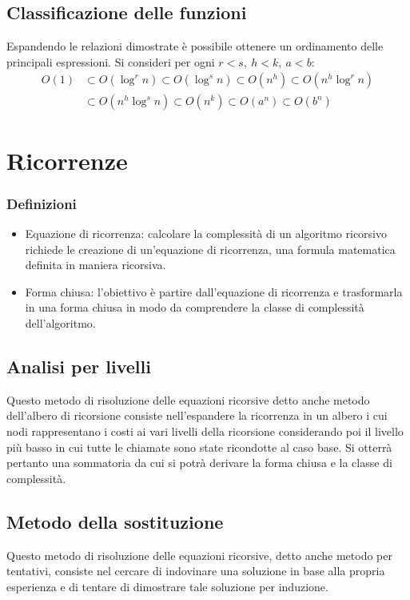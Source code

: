 \subsection{Classificazione delle funzioni}
Espandendo le relazioni dimostrate \`e possibile ottenere un ordinamento delle principali espressioni. Si consideri per ogni $r<s,\ h<k,\ a<b$:
\begin{align*}
O(1)&\subset O(\log^r n)\subset O(\log^s n)\subset O(n^h)\subset O(n^h\log^r n)\\
&\subset O(n^h\log^s n)\subset O(n^k)\subset O(a^n)\subset O(b^n)
\end{align*}
\section{Ricorrenze}
\subsubsection{Definizioni}
\begin{itemize}
\item Equazione di ricorrenza: calcolare la complessit\`a di un algoritmo ricorsivo richiede le creazione di un'equazione di ricorrenza, una formula 
matematica definita in maniera ricorsiva.
\item Forma chiusa: l'obiettivo \`e partire dall'equazione di ricorrenza e trasformarla in una forma chiusa in modo da comprendere la classe di 
complessit\`a dell'algoritmo.
\end{itemize}
\subsection{Analisi per livelli}
Questo metodo di risoluzione delle equazioni ricorsive detto anche metodo dell'albero di ricorsione consiste nell'espandere la ricorrenza in un albero i cui
nodi rappresentano i costi ai vari livelli della ricorsione considerando poi il livello pi\`u basso in cui tutte le chiamate sono state ricondotte al caso
base. Si otterr\`a pertanto una sommatoria da cui si potr\`a derivare la forma chiusa e la classe di complessit\`a.
\subsection{Metodo della sostituzione}
Questo metodo di risoluzione delle equazioni ricorsive, detto anche metodo per tentativi, consiste nel cercare di indovinare una soluzione in base alla 
propria esperienza e di tentare di dimostrare tale soluzione per induzione.
